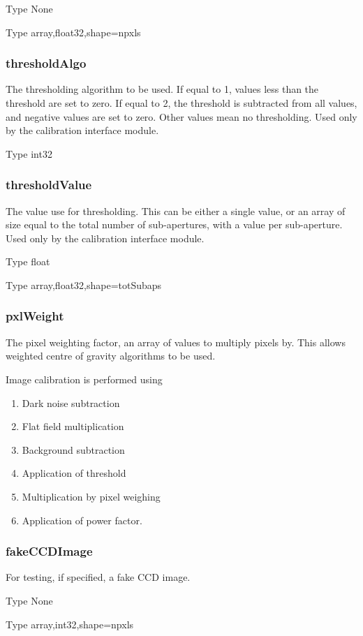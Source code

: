 \documentclass[a4,10pt]{article}
\begin{document}
Type None

Type array,float32,shape=npxls

\subsubsection{thresholdAlgo}
The thresholding algorithm to be used.  If equal to 1, 
values less than the threshold are set to zero.  If equal to 2, the
threshold is subtracted from all values, and negative values are set
to zero.  Other values mean no thresholding.  Used only by the calibration interface module.

Type int32

\subsubsection{thresholdValue}
The value use for thresholding.  This can be either a single value, or
an array of size equal to the total number of sub-apertures, with a
value per sub-aperture.  Used only by the calibration interface
module.

Type float

Type array,float32,shape=totSubaps

\subsubsection{pxlWeight}
The pixel weighting factor, an array of values to multiply pixels by.
This allows weighted centre of gravity algorithms to be used.

Image calibration is performed using
\begin{enumerate}
\item Dark noise subtraction
\item Flat field multiplication
\item Background subtraction
\item Application of threshold
\item Multiplication by pixel weighing
\item Application of power factor.
\end{enumerate}

\subsubsection{fakeCCDImage}
For testing, if specified, a fake CCD image.

Type None

Type array,int32,shape=npxls
\end{document}
